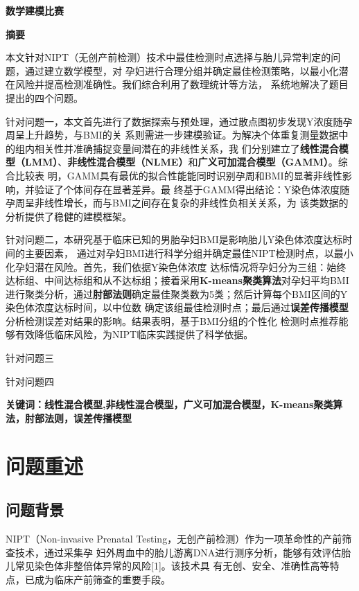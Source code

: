 \documentclass{article}
\date{}
\begin{document}
\vspace{-30pt}
\begin{center}
    \Large \textbf{数学建模比赛}  %
\end{center}
\vspace{-13pt}
\begin{center}
    \large \textbf{摘要}  %
\end{center}
\qquad 本文针对NIPT（无创产前检测）技术中最佳检测时点选择与胎儿异常判定的问题，通过建立数学模型，对
孕妇进行合理分组并确定最佳检测策略，以最小化潜在风险并提高检测准确性。我们综合利用了数理统计等方法，
系统地解决了题目提出的四个问题。

针对问题一，本文首先进行了数据探索与预处理，通过散点图初步发现Y浓度随孕周呈上升趋势，与BMI的关
系则需进一步建模验证。为解决个体重复测量数据中的组内相关性并准确捕捉变量间潜在的非线性关系，我
们分别建立了\textbf{线性混合模型（LMM）}、\textbf{非线性混合模型（NLME）}和\textbf{广义可加混合模型（GAMM）}。综合比较表
明，GAMM具有最优的拟合性能能同时识别孕周和BMI的显著非线性影响，并验证了个体间存在显著差异。最
终基于GAMM得出结论：Y染色体浓度随孕周呈非线性增长，而与BMI之间存在复杂的非线性负相关关系，为
该类数据的分析提供了稳健的建模框架。

针对问题二，本研究基于临床已知的男胎孕妇BMI是影响胎儿Y染色体浓度达标时间的主要因素，
通过对孕妇BMI进行科学分组并确定最佳NIPT检测时点，以最小化孕妇潜在风险。首先，我们依据Y染色体浓度
达标情况将孕妇分为三组：始终达标组、中间达标组和从不达标组；接着采用\textbf{K-means聚类算法}对孕妇平均BMI
进行聚类分析，通过\textbf{肘部法则}确定最佳聚类数为5类；然后计算每个BMI区间的Y染色体浓度达标时间，以中位数
确定该组最佳检测时点；最后通过\textbf{误差传播模型}分析检测误差对结果的影响。结果表明，基于BMI分组的个性化
检测时点推荐能够有效降低临床风险，为NIPT临床实践提供了科学依据。

针对问题三

针对问题四

\textbf{关键词：线性混合模型,非线性混合模型，广义可加混合模型，K-means聚类算法，肘部法则，误差传播模型}
\newpage
\section{\textbf{问题重述}}
\subsection{\textbf{问题背景}}
NIPT（Non-invasive Prenatal Testing，无创产前检测）作为一项革命性的产前筛查技术，通过采集孕
妇外周血中的胎儿游离DNA进行测序分析，能够有效评估胎儿常见染色体非整倍体异常的风险[1]。该技术具
有无创、安全、准确性高等特点，已成为临床产前筛查的重要手段。
\end{document}
